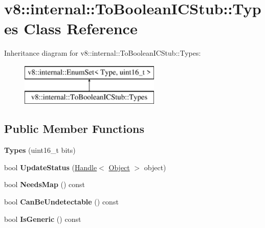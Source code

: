 \hypertarget{classv8_1_1internal_1_1_to_boolean_i_c_stub_1_1_types}{}\section{v8\+:\+:internal\+:\+:To\+Boolean\+I\+C\+Stub\+:\+:Types Class Reference}
\label{classv8_1_1internal_1_1_to_boolean_i_c_stub_1_1_types}
Inheritance diagram for v8\+:\+:internal\+:\+:To\+Boolean\+I\+C\+Stub\+:\+:Types\+:\begin{figure}[H]
\begin{center}
\leavevmode
\includegraphics[height=2.000000cm]{classv8_1_1internal_1_1_to_boolean_i_c_stub_1_1_types}
\end{center}
\end{figure}
\subsection*{Public Member Functions}
\begin{DoxyCompactItemize}
\item 
{\bfseries Types} (uint16\+\_\+t bits)\hypertarget{classv8_1_1internal_1_1_to_boolean_i_c_stub_1_1_types_a5d5956b14e9d4accdc39b0bd990b4761}{}\label{classv8_1_1internal_1_1_to_boolean_i_c_stub_1_1_types_a5d5956b14e9d4accdc39b0bd990b4761}

\item 
bool {\bfseries Update\+Status} (\hyperlink{classv8_1_1internal_1_1_handle}{Handle}$<$ \hyperlink{classv8_1_1internal_1_1_object}{Object} $>$ object)\hypertarget{classv8_1_1internal_1_1_to_boolean_i_c_stub_1_1_types_ab7df8713428736844a0053ca8d27778d}{}\label{classv8_1_1internal_1_1_to_boolean_i_c_stub_1_1_types_ab7df8713428736844a0053ca8d27778d}

\item 
bool {\bfseries Needs\+Map} () const \hypertarget{classv8_1_1internal_1_1_to_boolean_i_c_stub_1_1_types_a9faf8e3182753ff7a8e26e392ead31c7}{}\label{classv8_1_1internal_1_1_to_boolean_i_c_stub_1_1_types_a9faf8e3182753ff7a8e26e392ead31c7}

\item 
bool {\bfseries Can\+Be\+Undetectable} () const \hypertarget{classv8_1_1internal_1_1_to_boolean_i_c_stub_1_1_types_a7f2b267c711031d8dc5195811a360e33}{}\label{classv8_1_1internal_1_1_to_boolean_i_c_stub_1_1_types_a7f2b267c711031d8dc5195811a360e33}

\item 
bool {\bfseries Is\+Generic} () const \hypertarget{classv8_1_1internal_1_1_to_boolean_i_c_stub_1_1_types_a2cf6a320668b3b9806be02dc6ff99dea}{}\label{classv8_1_1internal_1_1_to_boolean_i_c_stub_1_1_types_a2cf6a320668b3b9806be02dc6ff99dea}

\end{DoxyCompactItemize}
